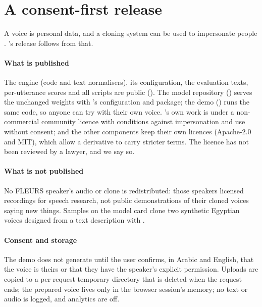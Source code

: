 \section{A consent-first release}\label{sec:release}

A voice is personal data, and a cloning system can be used to impersonate people
\citep{hutiri2024notmyvoice}. \BA's release follows from that.

\paragraph{What is published}
The engine (code and text normalisers), its configuration, the evaluation texts, per-utterance scores and all
scripts are public (\zenodo). The model repository (\hfmodel) serves the unchanged \vox weights with \BA's configuration and
package; the demo (\hfspace) runs the same code, so anyone can try \BA with their own voice. \BA's own work is under a non-commercial community licence with conditions against
impersonation and use without consent; \vox and the other components keep their own licences (Apache-2.0 and MIT),
which allow a derivative to carry stricter terms. The licence has not been reviewed by a lawyer, and we say so.

\paragraph{What is not published}
No FLEURS speaker's audio or clone is redistributed: those speakers licensed recordings for speech research, not
public demonstrations of their cloned voices saying new things. Samples on the model card clone two synthetic
Egyptian voices designed from a text description with \vox.

\paragraph{Consent and storage}
The demo does not generate until the user confirms, in Arabic and English, that the voice is theirs or that they
have the speaker's explicit permission. Uploads are copied to a per-request temporary directory that is deleted when
the request ends; the prepared voice lives only in the browser session's memory; no text or audio is logged, and
analytics are off.

